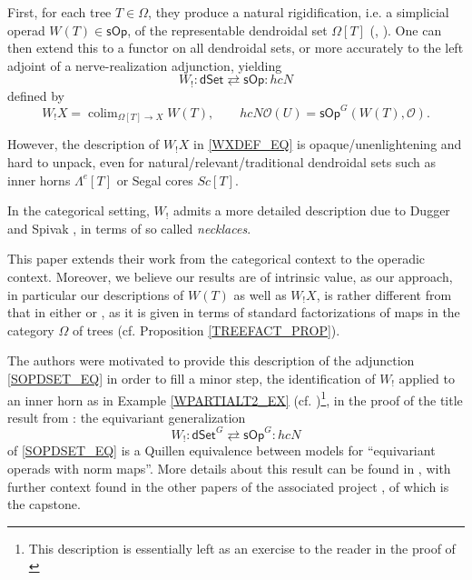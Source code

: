 \documentclass[a4paper,10pt
,draft
]{article}%
\numberwithin{equation}{section}
\numberwithin{figure}{section}
\theoremstyle{definition} %
\newcommand{\sOp}{\ensuremath{\mathsf{sOp}}}%
\newcommand{\dSet}{\mathsf{dSet}}
\DeclareMathOperator{\colim}{colim}%
\renewcommand{\O}{\ensuremath{\mathcal O}}
\newcommand{\1}{\ensuremath{\mathbbm 1}}%
\begin{document}
First, for each tree $T \in \Omega$, they produce a natural rigidification,
i.e. a simplicial operad $W(T) \in \sOp$,
of the representable dendroidal set $\Omega[T]$
(\cite[Rem. 7.3]{MW09}, \cite[Eq. (4.2.1)]{CM13b}).
One can then extend this to a functor on all dendroidal sets,
or more accurately to the left adjoint of a nerve-realization adjunction,
yielding
\begin{equation}
        \label{SOPDSET_EQ}
        W_! \colon \dSet \rightleftarrows \sOp \colon h c N           
\end{equation}
defined by
\begin{equation}
        \label{WXDEF_EQ}
        W_!X = \colim_{\Omega[T] \to X}W(T),
        \qquad
        hcN\O(U) = \sOp^G(W(T), \O).
\end{equation}

However, the description of $W_!X$ in \eqref{WXDEF_EQ} is opaque/unenlightening and hard to unpack,
even for natural/relevant/traditional dendroidal sets such as inner horns $\Lambda^e[T]$ or Segal cores $Sc[T]$.

In the categorical setting,
$W_!$ admits 
a more detailed description due to Dugger and Spivak \cite{DS11},
in terms of so called \emph{necklaces}.

This paper extends their work 
from the categorical context to the operadic context.
Moreover, we believe our results are of intrinsic value,
as our approach, in particular our descriptions of $W(T)$ as well as $W_! X$,
is rather different from that in either \cite{CM13b} or \cite{DS11},
as it is given in terms of 
standard factorizations of maps in the
category $\Omega$ of trees
(cf. Proposition \ref{TREEFACT_PROP}).

The authors were motivated to provide this description of the adjunction \eqref{SOPDSET_EQ}
in order to fill a minor step,
the identification of $W_!$ applied to an inner horn as in Example \ref{WPARTIALT2_EX} (cf. \cite[Lem. \ref{TAS-WLEFTQPUSH LEM}]{BP_TAS})\footnote{\textcolor{OliveGreen}{This description is essentially left as an exercise to the reader in the proof of \cite[Prop. 4.5]{CM13b}}},
in the proof of the title result from \cite{BP_TAS}:
the equivariant generalization
\[
        W_! \colon \dSet^G \rightleftarrows \sOp^G \colon h c N           
\]
of \eqref{SOPDSET_EQ} is a Quillen equivalence between models for ``equivariant operads with norm maps''.
More details about this result can be found in \cite{BP_TAS},
with further context found in the other papers of the associated project \cite{Per18,BP_geo,BP_edss,BP_FCOP,BP_ACOP}, of which \cite{BP_TAS} is the capstone.\\
\end{document}
